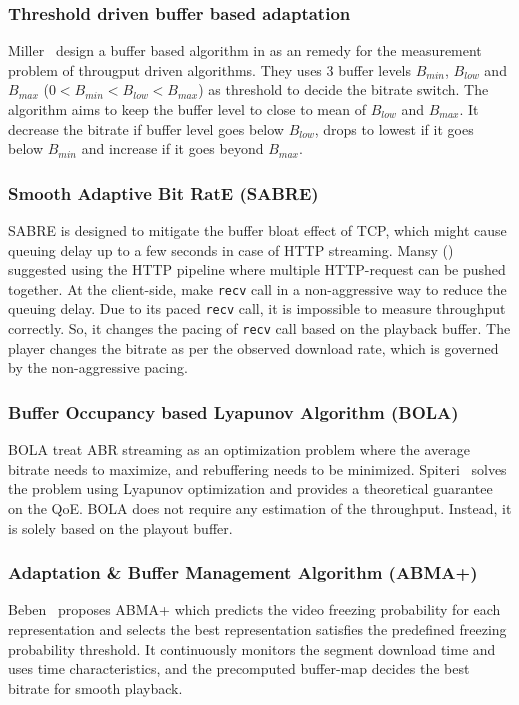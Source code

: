 \subsubsection{Threshold driven buffer based adaptation}
Miller \etal\ design a buffer based algorithm in \cite{6229732} as an remedy for the measurement problem of througput driven algorithms. They uses 3 buffer levels $B_{min}$, $B_{low}$ and $B_{max}$ ($0 < B_{min} < B_{low} < B_{max}$) as threshold to decide the bitrate switch. The algorithm aims to keep the buffer level to close to mean of $B_{low}$ and $B_{max}$. It decrease the bitrate if buffer level goes below $B_{low}$, drops to lowest if it goes below $B_{min}$ and increase if it goes beyond $B_{max}$.

\subsubsection{Smooth Adaptive Bit RatE (SABRE)}
SABRE is designed to mitigate the buffer bloat effect of TCP, which might cause queuing delay up to a few seconds in case of HTTP streaming. Mansy \etal(\cite{10.1145/2483977.2484004}) suggested using the HTTP pipeline where multiple HTTP-request can be pushed together. At the client-side, make {\tt recv} call in a non-aggressive way to reduce the queuing delay. Due to its paced {\tt recv} call, it is impossible to measure throughput correctly. So, it changes the pacing of {\tt recv} call based on the playback buffer. The player changes the bitrate as per the observed download rate, which is governed by the non-aggressive pacing.

\subsubsection{Buffer Occupancy based Lyapunov Algorithm (BOLA)}
BOLA\cite{Spiteri2016} treat ABR streaming as an optimization problem where the average bitrate needs to maximize, and rebuffering needs to be minimized. Spiteri \etal\ solves the problem using Lyapunov optimization and provides a theoretical guarantee on the QoE. BOLA does not require any estimation of the throughput. Instead, it is solely based on the playout buffer.

\subsubsection{Adaptation \& Buffer Management Algorithm (ABMA+)}
Beben \etal\ proposes ABMA+\cite{10.1145/2910017.2910596} which predicts the video freezing probability for each representation and selects the best representation satisfies the predefined freezing probability threshold. It continuously monitors the segment download time and uses time characteristics, and the precomputed buffer-map decides the best bitrate for smooth playback.

